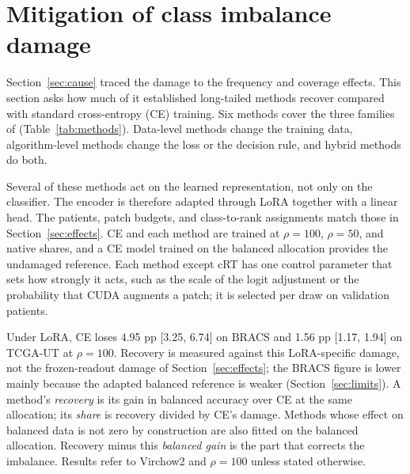 \documentclass[11pt]{article}
\begin{document}
\section{Mitigation of class imbalance damage}
\label{sec:mitigation}
Section~\ref{sec:cause} traced the damage to the frequency and coverage effects. This section asks how much of it established long-tailed methods recover compared with standard cross-entropy (CE) training. Six methods cover the three families of \citet{krawczyk2016learning} (Table~\ref{tab:methods}). Data-level methods change the training data, algorithm-level methods change the loss or the decision rule, and hybrid methods do both.

Several of these methods act on the learned representation, not only on the classifier. The encoder is therefore adapted through LoRA together with a linear head. The patients, patch budgets, and class-to-rank assignments match those in Section~\ref{sec:effects}. CE and each method are trained at $\rho=100$, $\rho=50$, and native shares, and a CE model trained on the balanced allocation provides the undamaged reference. Each method except cRT has one control parameter that sets how strongly it acts, such as the scale of the logit adjustment or the probability that CUDA augments a patch; it is selected per draw on validation patients.

Under LoRA, CE loses 4.95 pp [3.25, 6.74] on BRACS and 1.56 pp [1.17, 1.94] on TCGA-UT at $\rho=100$. Recovery is measured against this LoRA-specific damage, not the frozen-readout damage of Section~\ref{sec:effects}; the BRACS figure is lower mainly because the adapted balanced reference is weaker (Section~\ref{sec:limits}). A method's \emph{recovery} is its gain in balanced accuracy over CE at the same allocation; its \emph{share} is recovery divided by CE's damage. Methods whose effect on balanced data is not zero by construction are also fitted on the balanced allocation. Recovery minus this \emph{balanced gain} is the part that corrects the imbalance. Results refer to Virchow2 and $\rho=100$ unless stated otherwise.
\end{document}
